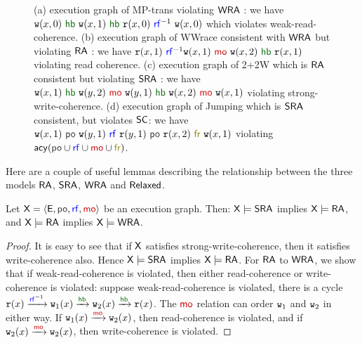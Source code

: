 \begin{figure}[h]
\caption{\footnotesize(a) execution graph of MP-trans violating $\mathsf{WRA}$ : we have  $\wt(x,0)~\hb~\wt(x,1)~\hb~\rd(x,0)~\rf^{-1}~\wt(x,0)$ which violates weak-read-coherence. (b) execution graph of WWrace consistent with $\mathsf{WRA}$ but violating $\mathsf{RA}$ : we have $\rd(x,1)~\rf^{-1}\wt(x,1)~\mo~\wt(x,2)~\hb~\rd(x,1)$ violating read coherence. (c) execution graph of 2+2W which is $\mathsf{RA}$ consistent but violating 
$\mathsf{SRA}$ : we have $\wt(x,1)~\hb~\wt(y,2)~\mo~\wt(y,1)~\hb~\wt(x,2)~\mo~\wt(x,1)$ violating strong-write-coherence. (d) 
execution graph of Jumping which is $\mathsf{SRA}$ consistent, but violates $\mathsf{SC}$: we have $\wt(x,1)~\po~\wt(y,1)~\rf~\rd(y,1)~\po~\rd(x,2)~\fr~\wt(x,1)$ violating 
$\acy(\po \cup \rf \cup \mo \cup \fr)$.
 }
\label{examplesra}
\vspace{-\baselineskip}
\end{figure}


Here are a couple of useful lemmas describing the relationship between the three models $\mathsf{RA}$, $\mathsf{SRA}$, $\mathsf{WRA}$ and $\mathsf{Relaxed}$.
 
\begin{lemma}\label{lem:sra-ra-wra-relationship}
Let $\ex = \tuple{\E, \po, \rf, \mo}$ be an execution graph. Then: $\mathsf{\color{black}X} \models \mathsf{SRA}$ implies $\mathsf{\color{black}X} \models \mathsf{RA}$, and $\mathsf{\color{black}X} \models \mathsf{RA}$ implies $\mathsf{\color{black}X} \models \mathsf{WRA}$. 
\end{lemma} 
\begin{proof}
  It is easy to see that if $\mathsf{\color{black}X}$ satisfies strong-write-coherence, then it satisfies write-coherence also. Hence $\mathsf{\color{black}X} \models \mathsf{SRA}$ implies $\mathsf{\color{black}X} \models \mathsf{RA}$. For $\mathsf{RA}$ to $\mathsf{WRA}$, we show that if weak-read-coherence is violated, then either read-coherence or write-coherence is violated: suppose weak-read-coherence is violated, there is a cycle $\rd(x) \xra{\rf^{-1}} \wt_1(x) \xra{\hb} \wt_2(x) \xra{\hb} \rd(x)$. The $\mo$ relation can order $\mathtt{w}_1$ and $\mathtt{w}_2$ in either way. If $\wt_1(x) \xra{\mo} \wt_2(x)$, then read-coherence is violated, and if $\wt_2(x) \xra{\mo} \wt_2(x)$, then write-coherence is violated.
\end{proof}

